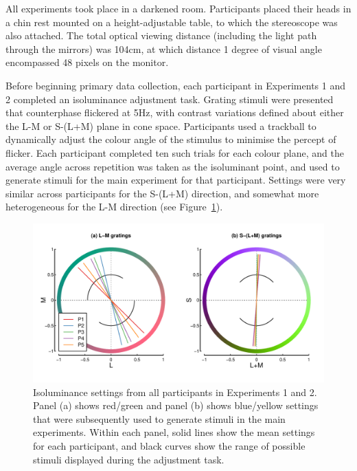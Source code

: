 \documentclass[
  letterpaper,
  DIV=11,
  numbers=noendperiod]{scrartcl}
\begin{document}
All experiments took place in a darkened room. Participants placed their
heads in a chin rest mounted on a height-adjustable table, to which the
stereoscope was also attached. The total optical viewing distance
(including the light path through the mirrors) was 104cm, at which
distance 1 degree of visual angle encompassed 48 pixels on the monitor.

Before beginning primary data collection, each participant in
Experiments 1 and 2 completed an isoluminance adjustment task. Grating
stimuli were presented that counterphase flickered at 5Hz, with contrast
variations defined about either the L-M or S-(L+M) plane in cone space.
Participants used a trackball to dynamically adjust the colour angle of
the stimulus to minimise the percept of flicker. Each participant
completed ten such trials for each colour plane, and the average angle
across repetition was taken as the isoluminant point, and used to
generate stimuli for the main experiment for that participant. Settings
were very similar across participants for the S-(L+M) direction, and
somewhat more heterogeneous for the L-M direction (see
Figure~\ref{fig-isofig}).

\begin{figure}

{\centering \includegraphics{Figures/isosettings.pdf}

}

\caption{\label{fig-isofig}Isoluminance settings from all participants
in Experiments 1 and 2. Panel (a) shows red/green and panel (b) shows
blue/yellow settings that were subsequently used to generate stimuli in
the main experiments. Within each panel, solid lines show the mean
settings for each participant, and black curves show the range of
possible stimuli displayed during the adjustment task.}

\end{figure}
\end{document}
